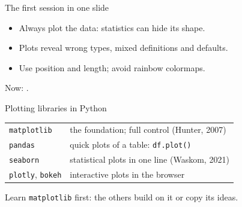 \documentclass[handout,aspectratio=169,t,9pt]{beamer}
\begin{document}
\begin{frame}{The first session in one slide}
  \vspace{0.3cm}
  \begin{recap}
    \begin{itemize}
      \item Always plot the data: statistics can hide its shape.
      \item Plots reveal wrong types, mixed definitions and defaults.
      \item Use position and length; avoid rainbow colormaps.
    \end{itemize}
  \end{recap}

  \vspace{0.6cm}
  Now: .
\end{frame}

\begin{frame}{Plotting libraries in Python}
  \vspace{0.3cm}
  \begin{tabular}{@{}ll@{}}
    \toprule
    \texttt{matplotlib} & the foundation; full control (Hunter, 2007) \\
    \texttt{pandas}     & quick plots of a table: \texttt{df.plot()} \\
    \texttt{seaborn}    & statistical plots in one line (Waskom, 2021) \\
    \texttt{plotly}, \texttt{bokeh} & interactive plots in the browser \\
    \bottomrule
  \end{tabular}

  \vfill
  \begin{takeaway}
    Learn \texttt{matplotlib} first: the others build on it or copy its
    ideas.
  \end{takeaway}

\end{frame}
\end{document}
